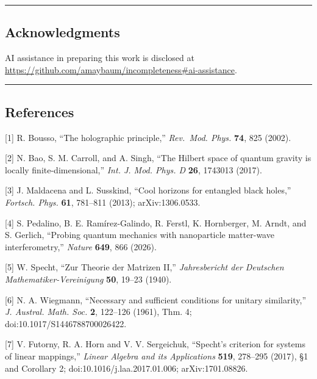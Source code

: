 \documentclass[
]{article}
\begin{document}
\begin{center}\rule{0.5\linewidth}{0.5pt}\end{center}

\hypertarget{acknowledgments}{%
\subsection{Acknowledgments}\label{acknowledgments}}

AI assistance in preparing this work is disclosed at\\
\url{https://github.com/amaybaum/incompleteness\#ai-assistance}.

\begin{center}\rule{0.5\linewidth}{0.5pt}\end{center}

\hypertarget{references}{%
\subsection{References}\label{references}}

{[}1{]} R. Bousso, ``The holographic principle,'' \emph{Rev.~Mod. Phys.}
\textbf{74}, 825 (2002).

{[}2{]} N. Bao, S. M. Carroll, and A. Singh, ``The Hilbert space of
quantum gravity is locally finite-dimensional,'' \emph{Int. J. Mod.
Phys. D} \textbf{26}, 1743013 (2017).

{[}3{]} J. Maldacena and L. Susskind, ``Cool horizons for entangled
black holes,'' \emph{Fortsch. Phys.} \textbf{61}, 781--811 (2013);
arXiv:1306.0533.

{[}4{]} S. Pedalino, B. E. Ramírez-Galindo, R. Ferstl, K. Hornberger, M.
Arndt, and S. Gerlich, ``Probing quantum mechanics with nanoparticle
matter-wave interferometry,'' \emph{Nature} \textbf{649}, 866 (2026).

{[}5{]} W. Specht, ``Zur Theorie der Matrizen II,'' \emph{Jahresbericht
der Deutschen Mathematiker-Vereinigung} \textbf{50}, 19--23 (1940).

{[}6{]} N. A. Wiegmann, ``Necessary and sufficient conditions for
unitary similarity,'' \emph{J. Austral. Math. Soc.} \textbf{2}, 122--126
(1961), Thm. 4; doi:10.1017/S1446788700026422.

{[}7{]} V. Futorny, R. A. Horn and V. V. Sergeichuk, ``Specht's
criterion for systems of linear mappings,'' \emph{Linear Algebra and its
Applications} \textbf{519}, 278--295 (2017), §1 and Corollary 2;
doi:10.1016/j.laa.2017.01.006; arXiv:1701.08826.
\end{document}
